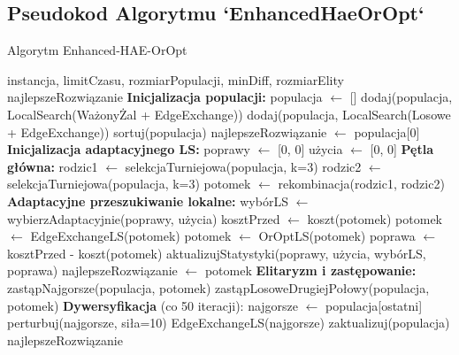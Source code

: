 \documentclass[12pt,a4paper]{article}
\begin{document}
\subsection{Pseudokod Algorytmu `EnhancedHaeOrOpt`}
\begin{algorithm}[H]
\caption{Algorytm Enhanced-HAE-OrOpt}
\label{alg:enhanced_hae_oropt}
\begin{algorithmic}[1]
\Require instancja, limitCzasu, rozmiarPopulacji, minDiff, rozmiarElity
\Ensure najlepszeRozwiązanie
\State \textbf{Inicjalizacja populacji:}
\State populacja $\leftarrow$ []
    \State dodaj(populacja, LocalSearch(WażonyŻal + EdgeExchange))
\EndFor
{}
    \State dodaj(populacja, LocalSearch(Losowe + EdgeExchange))
\EndFor
\State sortuj(populacja)
\State najlepszeRozwiązanie $\leftarrow$ populacja[0]
\State
\State \textbf{Inicjalizacja adaptacyjnego LS:}
\State poprawy $\leftarrow$ [0, 0] 
\State użycia $\leftarrow$ [0, 0]
\State
\State \textbf{Pętla główna:}
    \State rodzic1 $\leftarrow$ selekcjaTurniejowa(populacja, k=3)
    \State rodzic2 $\leftarrow$ selekcjaTurniejowa(populacja, k=3)
    \State potomek $\leftarrow$ rekombinacja(rodzic1, rodzic2)
    \State
    \State \textbf{Adaptacyjne przeszukiwanie lokalne:}
    \State wybórLS $\leftarrow$ wybierzAdaptacyjnie(poprawy, użycia)
    \State kosztPrzed $\leftarrow$ koszt(potomek)
        \State potomek $\leftarrow$ EdgeExchangeLS(potomek)
    \Else
        \State potomek $\leftarrow$ OrOptLS(potomek)
    \EndIf
    \State poprawa $\leftarrow$ kosztPrzed - koszt(potomek)
    \State aktualizujStatystyki(poprawy, użycia, wybórLS, poprawa)
    \State
        \State najlepszeRozwiązanie $\leftarrow$ potomek
    \EndIf
    \State
    \State \textbf{Elitaryzm i zastępowanie:}
        \State zastąpNajgorsze(populacja, potomek)
        \State zastąpLosoweDrugiejPołowy(populacja, potomek)
    \EndIf
    \State
    \State \textbf{Dywersyfikacja} (co 50 iteracji):
        \State najgorsze $\leftarrow$ populacja[ostatni]
        \State perturbuj(najgorsze, siła=10)
        \State EdgeExchangeLS(najgorsze)
        \State zaktualizuj(populacja)
    \EndIf
\EndWhile
\State \Return najlepszeRozwiązanie
\end{algorithmic}
\end{algorithm}
\end{document}
